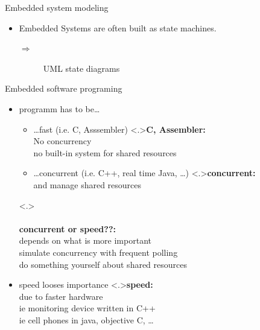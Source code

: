 \documentclass[ngerman={babel}, utf8, bigger, xcolor={table,dvipsnames}, ompress, hyperref={bookmarks,colorlinks}]{beamer}
\begin{document}
\begin{frame}{Embedded system modeling}
	\begin{itemize}
		\item Embedded Systems are often built as state machines.
		\begin{description}
			\item[ $\Rightarrow$] UML state diagrams
		\end{description}
	\end{itemize}
\end{frame}

\begin{frame}{Embedded software programing}
	\begin{itemize}
		\item programm has to be\dots
			\begin{itemize}
				\item \dots fast (i.e. C, Asssembler)
				\note<.>{\textbf{C, Assembler:}\\ No concurrency \\ no built-in system for shared resources}
				\item \dots concurrent (i.e. C++, real time Java, \dots){}
				\note<.>{\textbf{concurrent:}\\ and manage shared resources}
			\end{itemize}
			\note<.>{\\ \ \\ \textbf{concurrent or speed??:}\\ depends on what is more important \\ simulate concurrency with frequent polling \\ do something yourself about shared resources}
			\item speed looses importance
			\note<.>{\textbf{speed:}\\ due to faster hardware \\ ie monitoring device written in C++ \\ ie cell phones in java, objective C, \dots}
	\end{itemize}
\end{frame}
\end{document}
